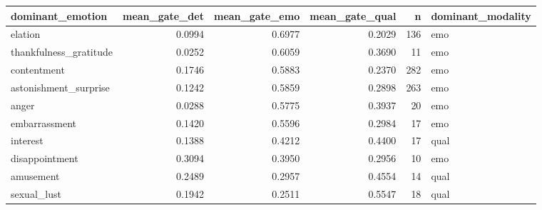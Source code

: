 \begin{tabular}{lrrrrl}
\toprule
dominant_emotion & mean_gate_det & mean_gate_emo & mean_gate_qual & n & dominant_modality \\
\midrule
elation & 0.0994 & 0.6977 & 0.2029 & 136 & emo \\
thankfulness_gratitude & 0.0252 & 0.6059 & 0.3690 & 11 & emo \\
contentment & 0.1746 & 0.5883 & 0.2370 & 282 & emo \\
astonishment_surprise & 0.1242 & 0.5859 & 0.2898 & 263 & emo \\
anger & 0.0288 & 0.5775 & 0.3937 & 20 & emo \\
embarrassment & 0.1420 & 0.5596 & 0.2984 & 17 & emo \\
interest & 0.1388 & 0.4212 & 0.4400 & 17 & qual \\
disappointment & 0.3094 & 0.3950 & 0.2956 & 10 & emo \\
amusement & 0.2489 & 0.2957 & 0.4554 & 14 & qual \\
sexual_lust & 0.1942 & 0.2511 & 0.5547 & 18 & qual \\
\bottomrule
\end{tabular}
